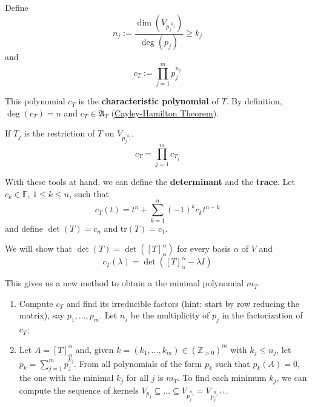 Define 
\[
	n_j := \frac{\dim (V_{{p_j}^{k_j}})}{\deg(p_j)} \geq k_j
\]
and
\[
	c_T := \prod_{j=1}^m p_j^{n_j}
\]

This polynomial $c_T$ is the \textbf{characteristic polynomial} of $T$. By definition, $\deg(c_T) = n$ and $c_T \in \mathfrak{A}_T$ (\hyperref[thm:cayley-hamilton]{Cayley-Hamilton Theorem}).

If $T_j$ is the restriction of $T$ on $V_{{p_j}^{k_j}}$,
\[
	c_T = \prod_{j=1}^m c_{T_j}
\]

With these tools at hand, we can define the \textbf{determinant}\label{def:determinant_1} and the \textbf{trace}. Let $c_k \in \mathbb{F}$, $1 \leq k \leq n$, such that
\[
	c_T(t) = t^n + \sum_{k=1}^n (-1)^k c_k t^{n-k}
\]
and define $\det(T) = c_n$ and $\text{tr}(T) = c_1$.

We will show that $\det(T) = \det([T]_\alpha^\alpha)$ for every basis $\alpha$ of $V$ and
\[
	c_T(\lambda) = \det([T]_\alpha^\alpha - \lambda I)
\]

This gives us a new method to obtain a the minimal polynomial $m_T$.

\begin{enumerate}
	\item Compute $c_T$ and find its irreducible factors (hint: start by row reducing the matrix), say $p_1, \ldots, p_m$. Let $n_j$ be the multiplicity of $p_j$ in the factorization of $c_T$;
	\item Let $A = [T]_\alpha^\alpha$ and, given $k = (k_1, \ldots, k_m) \in (\mathbb{Z}_{>0})^m$ with $k_j \leq n_j$, let $p_k = \sum_{j=1}^m p_j^{k_j}$. From all polynomials of the form $p_k$ such that $p_k(A) = 0$, the one with the minimal $k_j$ for all $j$ is $m_T$. To find each minimum $k_j$, we can compute the sequence of kernels $V_{p_j} \subseteq \ldots \subseteq V_{p_j^{n_j}} = V_{p_j^{n_j + 1}}$.
\end{enumerate}

